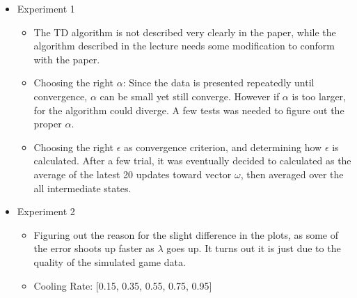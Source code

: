 \documentclass[10pt]{article}
\begin{document}
   	\begin{itemize}
     		\item  Experiment 1
     			\begin{itemize}
					\item The TD algorithm is not described very clearly in the paper, while the algorithm described in the lecture needs some modification to conform with the paper.
       				\item Choosing the right $\alpha$: Since the data is presented repeatedly until convergence, $\alpha$ can be small yet still converge. However if $\alpha$ is too larger, for the algorithm could diverge. A few tests was needed to figure out the proper $\alpha$.
					\item Choosing the right $\epsilon$ as convergence criterion, and determining how $\epsilon$ is calculated. After a few trial, it was eventually decided to calculated as the average of the latest 20 updates toward vector $\omega$, then averaged over the all intermediate states.
    			 \end{itemize}
		     \item  Experiment 2
    			 \begin{itemize}
    				   \item Figuring out the reason for the slight difference in the plots, as some of the error shoots up faster as $\lambda$ goes up. It turns out it is just due to the quality of the simulated game data.
       				   \item Cooling Rate: [0.15, 0.35, 0.55, 0.75, 0.95]
     			 \end{itemize}
	\end{itemize}









\end{document}
